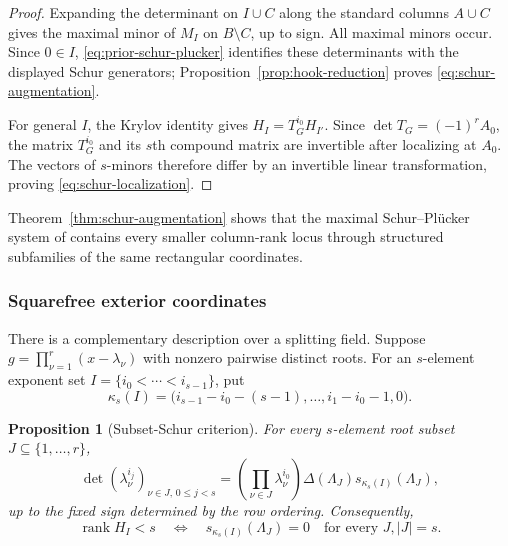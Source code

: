 \documentclass[10pt,fleqn]{article}
\numberwithin{equation}{section}
\newtheorem{proposition}[theorem]{Proposition}
\newcommand{\rank}{\operatorname{rank}}
\begin{document}
\begin{proof}
Expanding the determinant on $I\cup C$ along the standard columns
$A\cup C$ gives the maximal minor of $M_I$ on $B\setminus C$, up to sign.
All maximal minors occur.  Since $0\in I$, \eqref{eq:prior-schur-plucker}
identifies these determinants with the displayed Schur generators;
Proposition~\ref{prop:hook-reduction} proves \eqref{eq:schur-augmentation}.

For general $I$, the Krylov identity gives
$H_I=T_G^{i_0}H_{I'}$.  Since
$\det T_G=(-1)^rA_0$, the matrix $T_G^{i_0}$ and its $s$th compound matrix are invertible after
localizing at $A_0$.  The vectors of $s$-minors therefore differ by an invertible linear
transformation, proving \eqref{eq:schur-localization}.
\end{proof}

Theorem~\ref{thm:schur-augmentation} shows that the maximal Schur--Pl\"ucker system
of \cite{LiYuanSchur} contains every smaller column-rank locus through structured
subfamilies of the same rectangular coordinates.

\subsubsection{Squarefree exterior coordinates}

There is a complementary description over a splitting field.  Suppose
$g=\prod_{\nu=1}^r(x-\lambda_\nu)$ with nonzero pairwise distinct roots.  For an
$s$-element exponent set $I=\{i_0<\cdots<i_{s-1}\}$, put
\begin{equation}\label{eq:kappa-exterior}
 \kappa_s(I)=
 \bigl(i_{s-1}-i_0-(s-1),\ldots,i_1-i_0-1,0\bigr).
\end{equation}

\begin{proposition}[Subset-Schur criterion]\label{prop:subset-schur}
For every $s$-element root subset $J\subseteq\{1,\ldots,r\}$,
\begin{equation}\label{eq:subset-schur-minor}
 \det(\lambda_\nu^{i_j})_{\nu\in J,\,0\le j<s}
 =\left(\prod_{\nu\in J}\lambda_\nu^{i_0}\right)
 \Delta(\Lambda_J)s_{\kappa_s(I)}(\Lambda_J),
\end{equation}
up to the fixed sign determined by the row ordering.  Consequently,
\begin{equation}\label{eq:subset-schur-rank}
 \rank H_I<s
 \quad\Longleftrightarrow\quad
 s_{\kappa_s(I)}(\Lambda_J)=0
 \quad\text{for every }J, |J|=s.
\end{equation}
\end{proposition}
\end{document}
